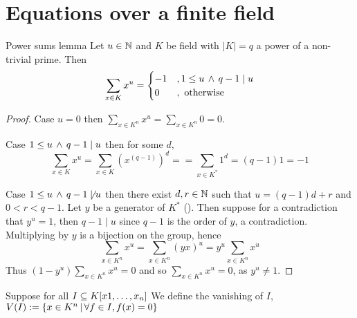 \section{Equations over a finite field}
\begin{prop}{Power sums lemma}
    Let $u \in \mathbb{N}$ and $K$ be field with $|K| = q$ 
    a power of a non-trivial prime.
    Then 
    \[
        \sum_{x \in K} x^u = 
        \begin{cases}
            -1 &, 1 \le u \, \land \, q - 1 \mid u\\
            0 &, \text{ otherwise}
        \end{cases}
    \]
\end{prop}
\begin{proof}
    Case $u = 0$ then 
    $\sum_{x \in K^n} x^u = \sum_{x \in K^n} 0 = 0$.

    Case $1 \le u \, \land \, q - 1 \mid u$ then for some $d$,
    \[\sum_{x \in K} x^u = \sum_{x \in K} (x^(q-1))^d = 
     = \sum_{x \in K^*} 1^d = (q - 1) 1 = -1\]

    Case $1 \le u \, \land \, q - 1 \not \mid u$ then there exist 
    $d, r \in \mathbb{N}$ such that $u = (q-1)d + r$ and $0 < r < q - 1$.
    Let $y$ be a generator of $K^*$ 
    ().
    Then suppose for a contradiction that $y^u = 1$,
    then $q - 1 \mid u$ since $q - 1$ is the order of $y$, 
    a contradiction.
    Multiplying by $y$ is a bijection on the group, 
    hence
    \[
        \sum_{x \in K^n} x^u = \sum_{x \in K^n} (yx)^u = 
        y^u \sum_{x \in K^n} x^u
    \]
    Thus $(1 - y^u) \sum_{x \in K^n} x^u = 0$ and so 
    $\sum_{x \in K^n} x^u = 0$, 
    as $y^u \ne 1$.
\end{proof}

\begin{dfn}[Vanishing]
    Suppose for all $I \subseteq K[x1, \dots , x_n]$
    We define the vanishing of $I$, 
    $V(I) := \{x \in K^n \,|\, \forall f \in I, f(x) = 0\}$
\end{dfn}

